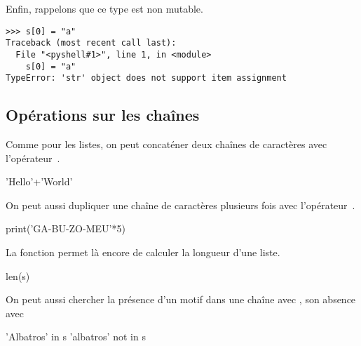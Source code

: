 Enfin, rappelons que ce type est non mutable.
\begin{verbatim}
>>> s[0] = "a"
Traceback (most recent call last):
  File "<pyshell#1>", line 1, in <module>
    s[0] = "a"
TypeError: 'str' object does not support item assignment
\end{verbatim}

\subsection{Opérations sur les chaînes}

Comme pour les listes, on peut concaténer deux chaînes de caractères avec l'opérateur~\pyv{+}.
\begin{pyconsole}
'Hello'+'World'
\end{pyconsole}
On peut aussi dupliquer une chaîne de caractères plusieurs fois avec l'opérateur~\pyv{*}.
\begin{pyconsole}
print('GA-BU-ZO-MEU\n'*5)
\end{pyconsole}
La fonction  permet là encore de calculer la longueur d'une liste.
\begin{pyconsole}
len(s)
\end{pyconsole}
On peut aussi chercher la présence d'un motif dans une chaîne avec , son absence avec 
\begin{pyconsole}
'Albatros' in s
'albatros' not in s
\end{pyconsole}



